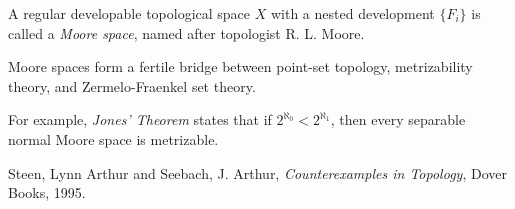 \documentclass[12pt]{article}
\newcommand{\<}{\langle}
\renewcommand{\>}{\rangle}
\begin{document}
A regular developable topological space $X$ with a nested development $\{F_i\}$ is called a \emph{Moore space}, named after topologist R. L. Moore.

Moore spaces form a fertile bridge between point-set topology, metrizability theory, and Zermelo-Fraenkel set theory.

For example, \emph{Jones' Theorem} states that if $2^{\aleph_0}<2^{\aleph_1}$, then every separable normal Moore space is metrizable.

\begin{thebibliography}{9}
Steen, Lynn Arthur and Seebach, J. Arthur, \emph{Counterexamples in Topology}, Dover Books, 1995.
\end{thebibliography}
\end{document}

